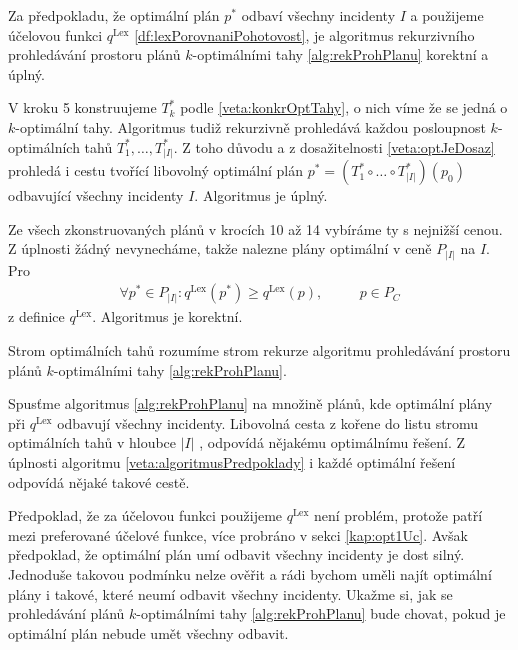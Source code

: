 \begin{veta}\label{veta:algoritmusPredpoklady}
  Za předpokladu, že optimální plán $p^*$ odbaví všechny incidenty $I$ a použijeme účelovou funkci $q^{\text{Lex}}$ \ref{df:lexPorovnaniPohotovost},
  je algoritmus rekurzivního prohledávání prostoru plánů $k$-optimálními tahy \ref{alg:rekProhPlanu} korektní a úplný.
\end{veta}
\begin{dukaz}
  V kroku 5 konstruujeme $T^*_k$ podle \ref{veta:konkrOptTahy}, o nich víme že se jedná o $k$-optimální tahy.
  Algoritmus tudiž rekurzivně prohledává každou posloupnost $k$-optimálních tahů $T^*_1, \dots, T^*_{|I|}$.
  Z toho důvodu a z dosažitelnosti \ref{veta:optJeDosaz} prohledá i cestu tvořící libovolný optimální plán $p^* = (T^*_1 \circ \dots \circ T^*_{|I|})(p_0)$ odbavující všechny incidenty $I$.
  Algoritmus je úplný.

  Ze všech zkonstruovaných plánů v krocích 10 až 14 vybíráme ty s nejnižší cenou.
  Z úplnosti žádný nevynecháme, takže nalezne plány optimální v ceně $P_{|I|}$ na $I$.
  Pro
  \begin{alignat*}
    \forall p^* \in P_{|I|} \colon q^{\text{Lex}}(p^*) \geq q^{\text{Lex}}(p), \quad && p \in P_C
  \end{alignat*}
  z definice $q^{\text{Lex}}$. Algoritmus je korektní.
\end{dukaz}

\begin{definice}
  Strom optimálních tahů rozumíme strom rekurze algoritmu prohledávání prostoru plánů $k$-optimálními tahy \ref{alg:rekProhPlanu}.
\end{definice}

\begin{veta}\label{veta:cestaAoptimum}
  Spusťme algoritmus \ref{alg:rekProhPlanu} na množině plánů, kde optimální plány při $q^{\text{Lex}}$ odbavují všechny incidenty.
  Libovolná cesta z kořene do listu stromu optimálních tahů v hloubce $|I|$ , odpovídá nějakému optimálnímu řešení.
  Z úplnosti algoritmu \ref{veta:algoritmusPredpoklady} i každé optimální řešení odpovídá nějaké takové cestě.
\end{veta}
\begin{dukaz}
\end{dukaz}

Předpoklad, že za účelovou funkci použijeme $q^{\text{Lex}}$ není problém, protože patří mezi preferované účelové funkce, více probráno v sekci \ref{kap:opt1Uc}.
Avšak předpoklad, že optimální plán umí odbavit všechny incidenty je dost silný.
Jednoduše takovou podmínku nelze ověřit a rádi bychom uměli najít optimální plány i takové, které neumí odbavit všechny incidenty.
Ukažme si, jak se prohledávání plánů $k$-optimálními tahy \ref{alg:rekProhPlanu} bude chovat, pokud je optimální plán nebude umět všechny odbavit.

